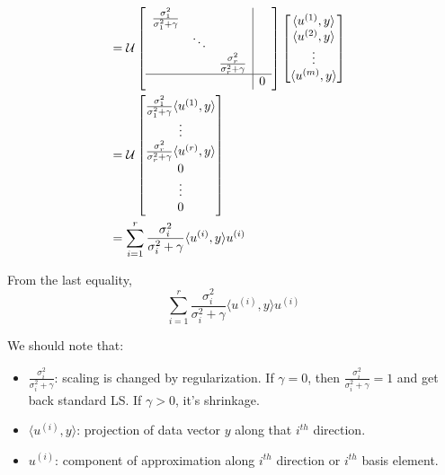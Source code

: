 \begin{align*}
\\
&= \mathcal{U}
\left[
\begin{array}{c|c}
\begin{matrix}
\frac{\sigma_1^2}{\sigma_1^2+\gamma} & &\\
&\ddots&\\
&&\frac{\sigma_r^2}{\sigma_r^2+\gamma}
\end{matrix}&  \\ \hline 
& 0
\end{array}
\right]
\begin{bmatrix}
\langle u^{(1)}, y\rangle\\
\langle u^{(2)}, y\rangle\\
\vdots\\
\langle u^{(m)}, y\rangle
\end{bmatrix}\\
&=\mathcal{U}
\begin{bmatrix}
\frac{\sigma_1^2}{\sigma_1^2+\gamma}\langle u^{(1)}, y\rangle\\
\vdots\\
\frac{\sigma_r^2}{\sigma_r^2+\gamma}\langle u^{(r)}, y\rangle\\
0\\
\vdots\\
0
\end{bmatrix}\\
&= \sum^r_{i=1}\frac{\sigma_i^2}{\sigma_i^2 + \gamma}\langle u^{(i)}, y\rangle u^{(i)}
\end{align*}

From the last equality,
\begin{equation*}
\sum^r_{i=1}\frac{\sigma_i^2}{\sigma_i^2 + \gamma}\langle u^{(i)}, y\rangle u^{(i)}
\end{equation*}

We should note that:
\begin{itemize}
	\item $\frac{\sigma_i^2}{\sigma_i^2 + \gamma}$: scaling is changed by regularization. If $\gamma = 0$, then  $\frac{\sigma_i^2}{\sigma_i^2 + \gamma} = 1$ and get back standard LS. If $\gamma > 0$, it's shrinkage. 
	
	\item $\langle u^{(i)}, y\rangle $: projection of data vector $y$ along that $i^{th}$ direction. 
	
	\item $u^{(i)}$: component of approximation along $i^{th}$ direction or $i^{th}$ basis element. 
\end{itemize}



